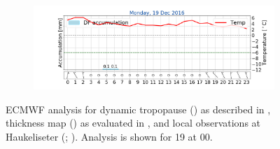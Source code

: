 \begin{figure}[!t]
	\begin{subfigure}[b]{0.49\textwidth}
		\includegraphics[trim={4.9cm 1.cm 1.5cm 1cm},clip,
		width=\textwidth]{./fig_weathermast/T_P_U_20161219}
		\caption{} \label{fig:TPU19}
	\end{subfigure}
	\caption{ECMWF analysis for dynamic tropopause (\protect{}) as described in , thickness map (\protect{}) as evaluated in , and local observations at Haukeliseter (\protect{}; ). Analysis is shown for \SI{19}{\dec} at 0\SI{0}{\UTC}. %
	}\label{fig:weather:19}
\end{figure}



